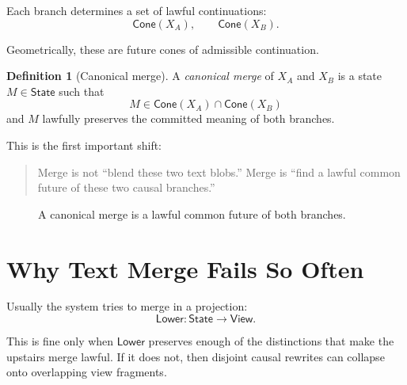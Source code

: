 \documentclass[11pt]{article}
\newcommand{\State}{\ensuremath{\mathsf{State}}}
\newcommand{\View}{\ensuremath{\mathsf{View}}}
\newcommand{\Lower}{\ensuremath{\mathsf{Lower}}}
\newcommand{\Cone}{\ensuremath{\mathsf{Cone}}}
\theoremstyle{definition}
\newtheorem{definition}{Definition}
\begin{document}
Each branch determines a set of lawful continuations:
\[
\Cone(X_A), \qquad \Cone(X_B).
\]

Geometrically, these are future cones of admissible continuation.

\begin{definition}[Canonical merge]
A \emph{canonical merge} of $X_A$ and $X_B$ is a state $M \in \State$ such that
\[
M \in \Cone(X_A) \cap \Cone(X_B)
\]
and $M$ lawfully preserves the committed meaning of both branches.
\end{definition}

This is the first important shift:

\begin{quote}
Merge is not ``blend these two text blobs.'' Merge is ``find a lawful common
future of these two causal branches.''
\end{quote}

\begin{figure}[h]
\centering
{}
\caption{A canonical merge is a lawful common future of both branches.}
\end{figure}

\section{Why Text Merge Fails So Often}

Usually the system tries to merge in a projection:
\[
\Lower : \State \to \View.
\]

This is fine only when $\Lower$ preserves enough of the distinctions that make
the upstairs merge lawful. If it does not, then disjoint causal rewrites can
collapse onto overlapping view fragments.
\end{document}

